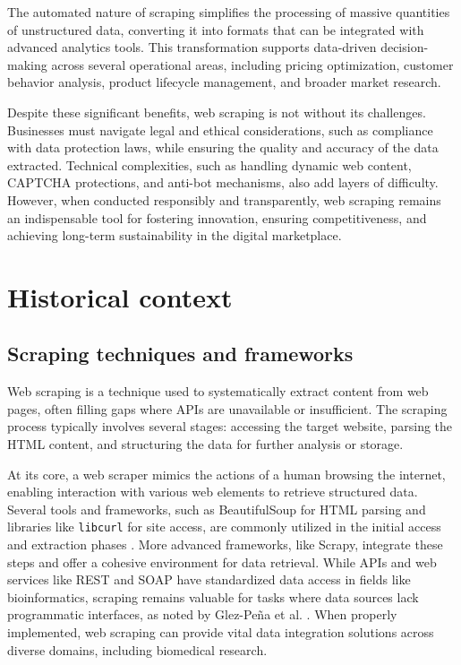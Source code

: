 The automated nature of scraping simplifies the processing of massive quantities of unstructured data, converting it into formats that can be integrated with advanced analytics tools. This transformation supports data-driven decision-making across several operational areas, including pricing optimization, customer behavior analysis, product lifecycle management, and broader market research.

Despite these significant benefits, web scraping is not without its challenges. Businesses must navigate legal and ethical considerations, such as compliance with data protection laws, while ensuring the quality and accuracy of the data extracted. Technical complexities, such as handling dynamic web content, CAPTCHA protections, and anti-bot mechanisms, also add layers of difficulty. However, when conducted responsibly and transparently, web scraping remains an indispensable tool for fostering innovation, ensuring competitiveness, and achieving long-term sustainability in the digital marketplace.
\section{Historical context}
\subsection{Scraping techniques and frameworks}

Web scraping is a technique used to systematically extract content from web pages, often filling gaps where APIs are unavailable or insufficient. The scraping process typically involves several stages: accessing the target website, parsing the HTML content, and structuring the data for further analysis or storage. 

At its core, a web scraper mimics the actions of a human browsing the internet, enabling interaction with various web elements to retrieve structured data. Several tools and frameworks, such as BeautifulSoup for HTML parsing and libraries like \texttt{libcurl} for site access, are commonly utilized in the initial access and extraction phases \cite{1}. More advanced frameworks, like Scrapy, integrate these steps and offer a cohesive environment for data retrieval. While APIs and web services like REST and SOAP have standardized data access in fields like bioinformatics, scraping remains valuable for tasks where data sources lack programmatic interfaces, as noted by Glez-Peña et al. \cite{1}. When properly implemented, web scraping can provide vital data integration solutions across diverse domains, including biomedical research.


